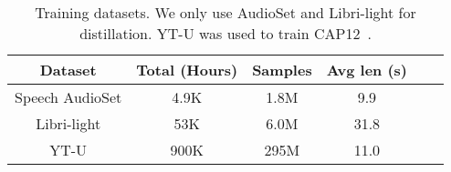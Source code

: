 \begin{table}[!t]
\captionsetup{size=footnotesize}
\centering
\caption{Training datasets. We only use AudioSet and Libri-light for distillation. YT-U was used to train CAP12~\cite{cap12}. }\label{tab:train_ds}
\footnotesize
\begin{tabular}{c c c c c c } \toprule
  Dataset & Total (Hours) & Samples &  Avg len (s)  \\
  \midrule
 Speech AudioSet & 4.9K & 1.8M & 9.9 \\
 Libri-light & 53K & 6.0M & 31.8 \\
 \midrule
 YT-U & 900K & 295M & 11.0 \\
 \bottomrule
\end{tabular}
\end{table}
